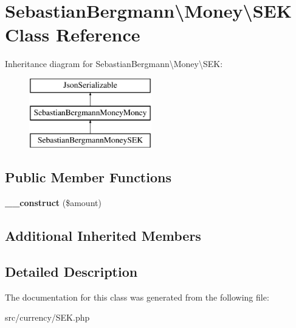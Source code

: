 \hypertarget{classSebastianBergmann_1_1Money_1_1SEK}{}\section{Sebastian\+Bergmann\textbackslash{}Money\textbackslash{}S\+E\+K Class Reference}
\label{classSebastianBergmann_1_1Money_1_1SEK}
Inheritance diagram for Sebastian\+Bergmann\textbackslash{}Money\textbackslash{}S\+E\+K\+:\begin{figure}[H]
\begin{center}
\leavevmode
\includegraphics[height=3.000000cm]{classSebastianBergmann_1_1Money_1_1SEK}
\end{center}
\end{figure}
\subsection*{Public Member Functions}
\begin{DoxyCompactItemize}
\item 
\hypertarget{classSebastianBergmann_1_1Money_1_1SEK_a33514a16a4115f75c251b7465071e308}{}{\bfseries \+\_\+\+\_\+construct} (\$amount)\label{classSebastianBergmann_1_1Money_1_1SEK_a33514a16a4115f75c251b7465071e308}

\end{DoxyCompactItemize}
\subsection*{Additional Inherited Members}


\subsection{Detailed Description}


The documentation for this class was generated from the following file\+:\begin{DoxyCompactItemize}
\item 
src/currency/S\+E\+K.\+php\end{DoxyCompactItemize}
